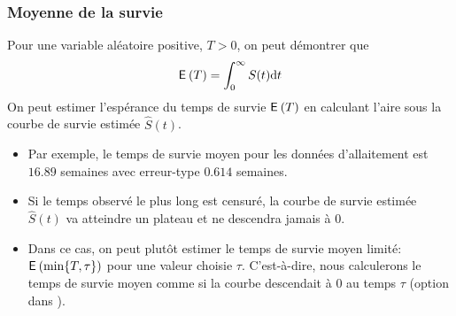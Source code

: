 \documentclass{beamer}
\begin{document}
\begin{frame}
\frametitle{Moyenne de la survie}
Pour une variable aléatoire positive, $T>0$, on peut démontrer que 
\begin{align*}
{\mathsf E}_{}\left(T\right) = \int_0^{\infty} S(t) \mathrm{d} t
\end{align*}
On peut estimer l'espérance du temps de survie ${\mathsf E}_{}\left(T\right)$ en calculant l'aire sous la courbe de survie estimée $\widehat{S}(t)$. 
\begin{itemize}
\item Par exemple, le temps de survie moyen pour les données d'allaitement est $16.89$ semaines avec erreur-type $0.614$ semaines.
\item Si le temps observé le plus long est \alert{censuré}, la courbe de survie estimée $\widehat{S}(t)$ va atteindre un plateau et ne descendra jamais à $0$.
\item Dans ce cas, on peut plutôt estimer le temps de survie moyen limité: ${\mathsf E}_{}\left(\min\{T,\tau\}\right)$ pour une valeur choisie $\tau$. C'est-à-dire, nous calculerons le temps de survie moyen comme si la courbe descendait à $0$ au temps $\tau$ (option  dans \SASlang{}).
\end{itemize} 
\end{frame}
% 
%   
\end{document}
